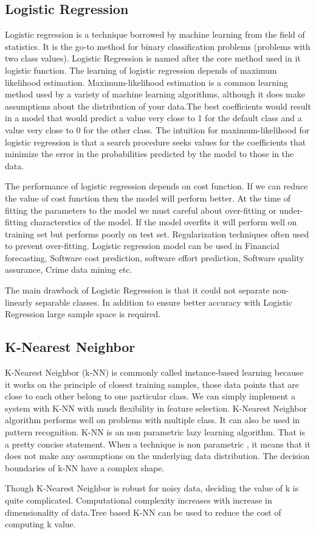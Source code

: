 \subsection{Logistic Regression}
Logistic regression is a technique borrowed by machine learning from the field of statistics. It is the go-to method for binary classification problems (problems with two class values). Logistic Regression is named after the core method used in it logistic function. The learning of logistic regression depends of maximum likelihood estimation. Maximum-likelihood estimation is a common learning method used by a variety of machine learning algorithms, although it does make assumptions about the distribution of your data.The best coefficients would result in a model that would predict a value very close to 1 for the default class and a value very close to 0 for the other class. The intuition for maximum-likelihood for logistic regression is that a search procedure seeks values for the coefficients that minimize the error in the probabilities predicted by the model to those in the data.
\par
\vspace{0.5cm}
The performance of logistic regression depends on cost function. If we can reduce the value of cost function then the model will perform better. At the time of fitting the parameters to the model we must careful about over-fitting or under-fitting characterstics of the model. If the model overfits it will perform well on training set but performs poorly on test set. Regularization techniques often used to prevent over-fitting. Logistic regression model can be used in Financial forecasting, Software cost prediction, software effort prediction, Software quality assurance, Crime data mining etc. 
\par
\vspace{0.5cm}
The main drawback of Logistic Regression is that it could not separate non-linearly separable classes. In addition to ensure better accuracy with Logistic Regression large sample space is required.

\subsection{K-Nearest Neighbor}
K-Nearest Neighbor (k-NN) is commonly called instance-based learning because it works on the principle of closest training samples, those data points that are close to each other belong to one particular class. We can simply implement a system with K-NN with much flexibility in feature selection. K-Nearest Neighbor algorithm performs well on problems with multiple class. It can also be used in pattern recognition. K-NN is an non parametric lazy learning algorithm. That is a pretty concise statement. When a technique is non parametric , it means that it does not make any assumptions on the underlying data distribution. The decision boundaries of k-NN have a complex shape.
\par
\vspace{0.5cm}
 Though K-Nearest Neighbor is robust for noisy data, deciding the value of k is quite complicated. Computational complexity increases with increase in dimensionality of data.Tree based K-NN can be used to reduce the cost of computing k value.
 
